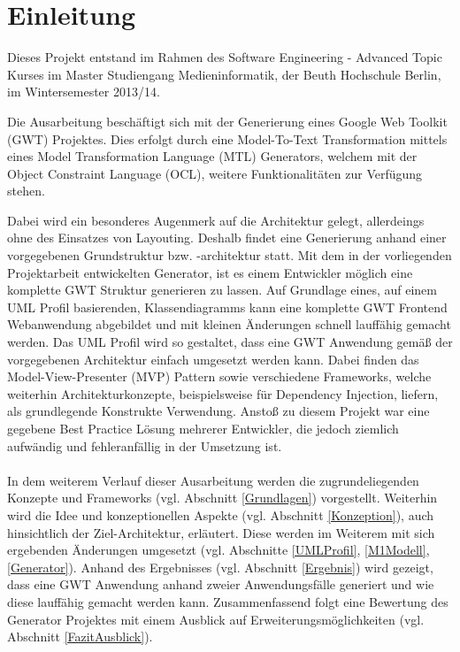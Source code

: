 \chapter{Einleitung}
\label{Einleitung}
Dieses Projekt entstand im Rahmen des Software Engineering - Advanced Topic
Kurses im Master Studiengang Medieninformatik, der Beuth Hochschule Berlin, im
Wintersemester 2013/14.

Die Ausarbeitung beschäftigt sich mit der Generierung eines Google Web
Toolkit (GWT) Projektes.
Dies erfolgt durch eine Model-To-Text Transformation mittels eines Model
Transformation Language (MTL) Generators, welchem mit der Object Constraint Language (OCL), weitere
Funktionalitäten zur Verfügung stehen. 

Dabei wird ein besonderes Augenmerk auf die Architektur gelegt, allerdeings ohne
des Einsatzes von Layouting. Deshalb findet eine Generierung anhand einer
vorgegebenen Grundstruktur bzw. -architektur statt. Mit dem in der vorliegenden
Projektarbeit entwickelten Generator, ist es einem Entwickler möglich eine
komplette GWT Struktur generieren zu lassen. Auf Grundlage eines, auf einem UML
Profil basierenden, Klassendiagramms kann eine komplette GWT Frontend
Webanwendung abgebildet und mit kleinen Änderungen schnell lauffähig gemacht werden.
Das UML Profil wird so gestaltet, dass eine GWT Anwendung gemäß der vorgegebenen
Architektur einfach umgesetzt werden kann. Dabei finden das
Model-View-Presenter (MVP) Pattern sowie verschiedene Frameworks, welche
weiterhin Architekturkonzepte, beispielsweise für Dependency Injection, liefern,
als grundlegende Konstrukte Verwendung. Anstoß zu diesem Projekt war eine
gegebene \glqq{}Best Practice\grqq{} Lösung mehrerer Entwickler, die jedoch
ziemlich aufwändig und fehleranfällig in der Umsetzung ist.
\\\\
In dem weiterem Verlauf dieser Ausarbeitung werden die zugrundeliegenden
Konzepte und Frameworks (vgl. Abschnitt \ref{Grundlagen}) vorgestellt. Weiterhin
wird die Idee und konzeptionellen Aspekte (vgl. Abschnitt \ref{Konzeption}),
auch hinsichtlich der Ziel-Architektur, erläutert. Diese werden im
Weiterem mit sich ergebenden Änderungen umgesetzt (vgl. Abschnitte \ref{UMLProfil},
\ref{M1Modell}, \ref{Generator}).
Anhand des Ergebnisses (vgl. Abschnitt \ref{Ergebnis}) wird gezeigt, dass eine
GWT Anwendung anhand zweier Anwendungsfälle generiert und wie diese lauffähig
gemacht werden kann. Zusammenfassend folgt eine Bewertung des Generator
Projektes mit einem Ausblick auf Erweiterungsmöglichkeiten (vgl. Abschnitt
\ref{FazitAusblick}).
